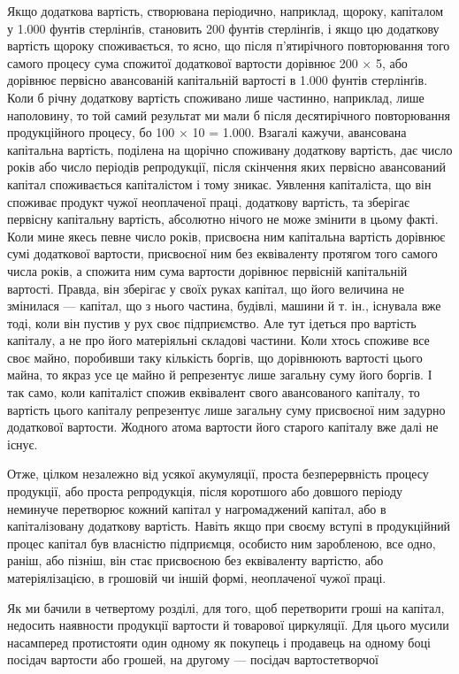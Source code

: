 Якщо додаткова вартість, створювана періодично, наприклад,
щороку, капіталом у 1.000 фунтів стерлінґів, становить 200 фунтів
стерлінґів, і якщо цю додаткову вартість щороку споживається,
то ясно, що після п’ятирічного повторювання того самого
процесу сума спожитої додаткової вартости дорівнює 200 × 5, або
дорівнює первісно авансованій капітальній вартості в 1.000 фунтів
стерлінґів. Коли б річну додаткову вартість споживано лише
частинно, наприклад, лише наполовину, то той самий результат
ми мали б після десятирічного повторювання продукційного
процесу, бо 100 × 10 = 1.000. Взагалі кажучи, авансована
капітальна вартість, поділена на щорічно споживану додаткову
вартість, дає число років або число періодів репродукції, після
скінчення яких первісно авансований капітал споживається
капіталістом і тому зникає. Уявлення капіталіста, що він споживає
продукт чужої неоплаченої праці, додаткову вартість,
та зберігає первісну капітальну вартість, абсолютно нічого не
може змінити в цьому факті. Коли мине якесь певне число років,
присвоєна ним капітальна вартість дорівнює сумі додаткової
вартости, присвоєної ним без еквіваленту протягом того самого
числа років, а спожита ним сума вартости дорівнює первісній
капітальній вартості. Правда, він зберігає у своїх руках капітал,
що його величина не змінилася — капітал, що з нього частина,
будівлі, машини й т. ін., існувала вже тоді, коли він пустив у рух
своє підприємство. Але тут ідеться про вартість капіталу, а не
про його матеріяльні складові частини. Коли хтось споживе
все своє майно, поробивши таку кількість боргів, що дорівнюють
вартості цього майна, то якраз усе це майно й репрезентує лише
загальну суму його боргів. І так само, коли капіталіст спожив
еквівалент свого авансованого капіталу, то вартість цього капіталу
репрезентує лише загальну суму присвоєної ним задурно
додаткової вартости. Жодного атома вартости його старого капіталу
вже далі не існує.

Отже, цілком незалежно від усякої акумуляції, проста безперервність
процесу продукції, або проста репродукція, після
коротшого або довшого періоду неминуче перетворює кожний
капітал у нагромаджений капітал, або в капіталізовану додаткову
вартість. Навіть якщо при своєму вступі в продукційний процес
капітал був власністю підприємця, особисто ним заробленою,
все одно, раніш, або пізніш, він стає присвоєною без еквіваленту
вартістю, або матеріялізацією, в грошовій чи іншій формі, неоплаченої
чужої праці.

Як ми бачили в четвертому розділі, для того, щоб перетворити
гроші на капітал, недосить наявности продукції вартости й товарової
циркуляції. Для цього мусили насамперед протистояти
один одному як покупець і продавець на одному боці посідач
вартости або грошей, на другому — посідач вартостетворчої
\parbreak{}  %
